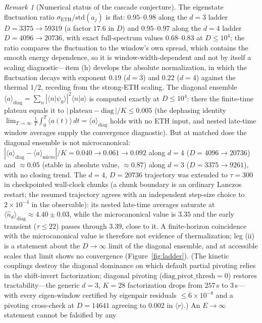 \documentclass[11pt,a4paper]{article}
\theoremstyle{plain}
\theoremstyle{definition}
\theoremstyle{remark}
\newtheorem{remark}[theorem]{Remark}
\newcommand{\braket}[2]{\langle #1\rvert #2\rangle}
\begin{document}
\begin{remark}[Numerical status of the cascade conjecture]
The eigenstate fluctuation ratio $\sigma_{\mathrm{ETH}}/\mathrm{std}(a_{j})$ is flat:
$0.95$--$0.98$ along the $d=3$ ladder $D=3375\to59319$ (a factor $17.6$ in $D$) and
$0.95$--$0.97$ along the $d=4$ ladder $D=4096\to20736$, with exact full-spectrum values
$0.68$--$0.83$ at $D\leq10^{4}$; the ratio compares the fluctuation to the window's own
spread, which contains the smooth energy dependence, so it is window-width-dependent and
not by itself a scaling diagnostic---item (h) develops the absolute normalization, in which
the fluctuation decays with exponent $0.19$ ($d=3$) and $0.22$ ($d=4$) against the thermal
$1/2$, receding from the strong-ETH scaling. The diagonal ensemble
$\langle a\rangle_{\mathrm{diag}}=\sum_{n}|\braket{n}{\psi_{0}}|^{2}\braket{n}{a}$
is computed exactly at $D\leq10^{4}$: there the finite-time plateau equals it to
$|\,\mathrm{plateau}-\mathrm{diag}\,|/K\leq0.005$ (the dephasing identity
$\lim_{T\to\infty}\frac{1}{T}\int_{0}^{T}\langle a(t)\rangle\,dt=\langle
a\rangle_{\mathrm{diag}}$ holds with no ETH input, and nested late-time window averages
supply the convergence diagnostic). But at matched dose the diagonal ensemble is not
microcanonical: $|\langle a\rangle_{\mathrm{diag}}-\langle
a\rangle_{\mathrm{micro}}|/K=0.040\to0.061\to0.092$ along $d=4$ ($D=4096\to20736$) and
$\approx0.05$ (stable in absolute value, $\approx0.87$) along $d=3$ ($D=3375\to9261$),
with no closing trend. The $d=4$, $D=20736$ trajectory was extended to $\tau=300$ in
checkpointed wall-clock chunks (a chunk boundary is an ordinary Lanczos restart; the resumed
trajectory agrees with an independent step-size choice to $2\times10^{-4}$ in the
observable): its nested late-time averages saturate at
$\langle\hat n_{d}\rangle_{\mathrm{diag}}\approx4.40\pm0.03$, while the microcanonical value
is $3.35$ and the early transient ($\tau\leq22$) passes through $3.39$, close to it. A
finite-horizon coincidence with the microcanonical value is therefore not evidence of
thermalization; leg (ii) is a statement about the $D\to\infty$ limit of the diagonal
ensemble, and at accessible scales that limit shows no convergence (Figure~\ref{fig:ladder}).
(The kinetic couplings destroy the diagonal dominance on which default partial pivoting
relies in the shift-invert factorization; diagonal pivoting
($\mathrm{diag\_pivot\_thresh}=0$) restores tractability---the generic $d=3$, $K=28$
factorization drops from $257$\,s to $3$\,s---with every eigen-window certified by
eigenpair residuals $\leq6\times10^{-8}$ and a pivoting cross-check at $D=14641$ agreeing
to $0.002$ in $\langle r\rangle$.) An $E\to\infty$ statement cannot be falsified by any

\end{remark}
\end{document}

